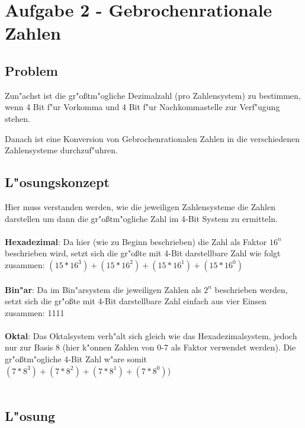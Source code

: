 \documentclass[a4paper,11pt,titlepage]{article}
\begin{document}
    \section{Aufgabe 2 - Gebrochenrationale Zahlen}

    \subsection{Problem}
    Zun"achst ist die gr"oßtm"ogliche Dezimalzahl (pro Zahlensystem) zu bestimmen, wenn 4 Bit f"ur Vorkomma und 4 Bit f"ur Nachkommastelle zur Verf"ugung stehen.

    Danach ist eine Konversion von Gebrochenrationalen Zahlen in die verschiedenen Zahlensysteme durchzuf"uhren.

    \subsection{L"osungskonzept}
    Hier muss verstanden werden, wie die jeweiligen Zahlensysteme die Zahlen darstellen um dann die gr"oßtm"ogliche Zahl im 4-Bit System zu ermitteln. \\ \\

    \noindent \textbf{Hexadezimal}: Da hier (wie zu Beginn beschrieben) die Zahl als Faktor $16^n$ beschrieben wird, setzt sich die gr"oßte mit 4-Bit darstellbare Zahl wie folgt zusammen: $(15 * 16^3) + (15 * 16^2) + (15 * 16^1) + (15 * 16^0)$ \\ \\
    \noindent \textbf{Bin"ar}: Da im Bin"arsystem die jeweiligen Zahlen als $2^n$ beschrieben werden, setzt sich die gr"oßte mit 4-Bit darstellbare Zahl einfach aus vier Einsen zusammen: 1111 \\ \\
    \noindent \textbf{Oktal}: Das Oktalsystem verh"alt sich gleich wie das Hexadezimalsystem, jedoch nur zur Basis 8 (hier k"onnen Zahlen von 0-7 als Faktor verwendet werden). Die gr"oßtm"ogliche 4-Bit Zahl w"are somit $(7 * 8^3) + (7 * 8^2) + (7 * 8^1) + (7 * 8^0)$) \\ \\

    \subsection{L"osung}
\end{document}
